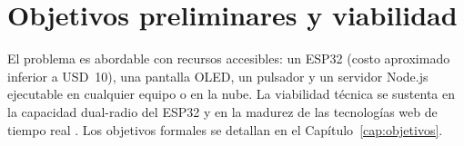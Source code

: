 \section{Objetivos preliminares y viabilidad}
El problema es abordable con recursos accesibles: un ESP32 (costo aproximado inferior a USD~10), una pantalla OLED, un pulsador y un servidor Node.js ejecutable en cualquier equipo o en la nube. La viabilidad técnica se sustenta en la capacidad dual\nobreakdash-radio del ESP32 \parencite{espressif2023} y en la madurez de las tecnologías web de tiempo real \parencite{rfc6455}. Los objetivos formales se detallan en el Capítulo~\ref{cap:objetivos}.
